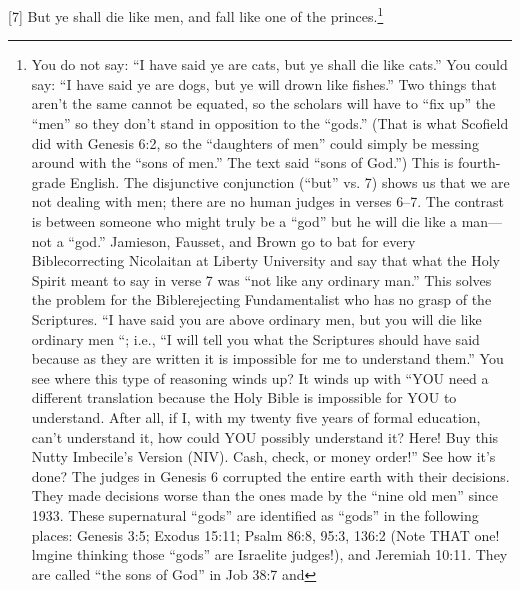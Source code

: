 [7] \textcolor[rgb]{0.00,0.00,1.00}{But ye shall die like men, and fall like one of the princes.}\footnote{You do not say: “I have said
ye are cats, but ye shall die like cats.” You
could say: “I have said ye are dogs, but ye will
drown like fishes.” Two things that aren’t the
same cannot be equated, so the scholars will
have to “fix up” the “men” so they don’t
stand in opposition to the “gods.” (That is
what Scofield did with Genesis 6:2, so the
“daughters of men” could simply be messing
around with the “sons of men.” The text said
“sons of God.”)
This is fourth-grade English. The disjunctive
conjunction (“but” vs. 7) shows us that we
are not dealing with men; there are no human
judges in verses 6–7. The contrast is between
someone who might truly be a “god” but he
will die like a man—not a “god.” Jamieson,
Fausset, and Brown go to bat for every Biblecorrecting
Nicolaitan at Liberty University
and say that what the Holy Spirit meant to say
in verse 7 was “not like any ordinary man.”
This solves the problem for the Biblerejecting
Fundamentalist who has no grasp of
the Scriptures. “I have said you are above
ordinary men, but you will die like ordinary
men “; i.e., “I will tell you what the
Scriptures should have said because as they
are written it is impossible for me to
understand them.” You see where this type of
reasoning winds up? It winds up with “YOU
need a different translation because the Holy
Bible is impossible for YOU to understand.
After all, if I, with my twenty five years of
formal education, can’t understand it, how
could YOU possibly understand it? Here!
Buy this Nutty Imbecile’s Version (NIV).
Cash, check, or money order!” See how it’s
done? The judges in Genesis 6 corrupted the entire
earth with their decisions. They made
decisions worse than the ones made by the
“nine old men” since 1933. These
supernatural “gods” are identified as “gods”
in the following places: Genesis 3:5; Exodus
15:11; Psalm 86:8, 95:3, 136:2 (Note THAT
one! lmgine thinking those “gods” are
Israelite judges!), and Jeremiah 10:11. They
are called “the sons of God” in Job 38:7 and
}
